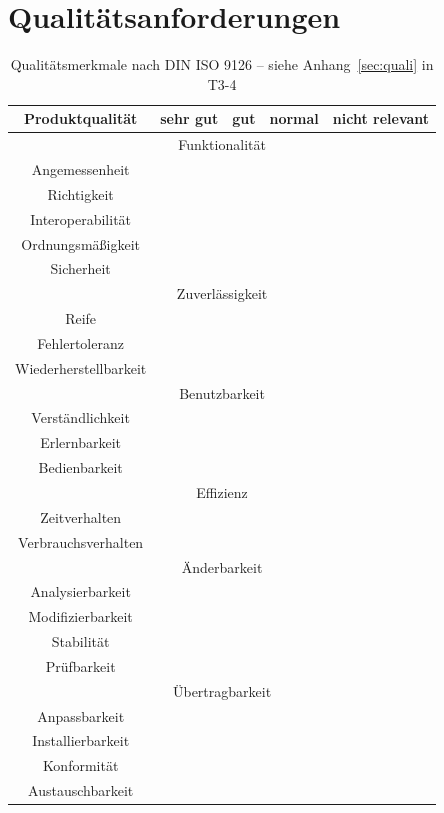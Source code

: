 	\section{Qualitätsanforderungen}
	\begin{table}[ht]
	\caption{Qualitätsmerkmale nach DIN ISO 9126 – siehe Anhang~\ref{sec:quali} in T3-4}
	\centering
		\begin{tabular}{|c|c|c|c|c|}
		\hline Produktqualität & sehr gut & gut & normal & nicht relevant \\ 
		\hline \multicolumn{5}{|c|}{Funktionalität}   \\ 
		\hline Angemessenheit &  &  & \checkmark &  \\ 
		\hline Richtigkeit &  & \checkmark  &  &  \\ 
		\hline Interoperabilität &  &  &\checkmark  &  \\ 
		\hline Ordnungsmäßigkeit &  &  &\checkmark  &  \\ 
		\hline Sicherheit & & \checkmark & &  \\ 
		\hline \multicolumn{5}{|c|}{Zuverlässigkeit}   \\ 
		\hline Reife &  &   & \checkmark &  \\ 
		\hline Fehlertoleranz &  &  \checkmark &  &  \\ 
		\hline Wiederherstellbarkeit & \checkmark  &  &  &  \\ 
		\hline \multicolumn{5}{|c|}{Benutzbarkeit}  \\ 
		\hline Verständlichkeit &  &  & \checkmark  &  \\ 
		\hline Erlernbarkeit &  &   &  &\checkmark  \\ 
		\hline Bedienbarkeit &  &   & \checkmark &  \\ 
		\hline \multicolumn{5}{|c|}{Effizienz} \\ 
		\hline Zeitverhalten &  &  &\checkmark   &  \\ 
		\hline Verbrauchsverhalten &  &  &\checkmark   &  \\ 
		\hline \multicolumn{5}{|c|}{Änderbarkeit} \\ 
		\hline Analysierbarkeit &  &   & \checkmark &  \\ 
		\hline Modifizierbarkeit &  &  &  \checkmark  &  \\ 
		\hline Stabilität &  &  & \checkmark &  \\ 
		\hline Prüfbarkeit &   &  &\checkmark  &  \\ 
		\hline \multicolumn{5}{|c|}{Übertragbarkeit}  \\ 
		\hline Anpassbarkeit &  &  &\checkmark  &  \\ 
		\hline Installierbarkeit &  &  &  \checkmark &  \\ 
		\hline Konformität	 &  &  &\checkmark   &  \\ 
		\hline Austauschbarkeit &  &  &   & \checkmark \\ 
		\hline 
		\end{tabular} 
	\label{tab:quali_anf}
	\end{table}
	

